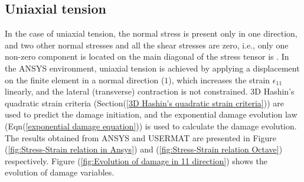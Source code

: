 \documentclass[12pt,twoside]{report}
\begin{document}
\subsection{Uniaxial tension}
\indent\indent\indent In the case of uniaxial tension, the normal stress is present only in one direction, and two other normal stresses and all the shear stresses are zero, i.e., only one non-zero component is located on the main diagonal of the stress tensor is .  In the ANSYS environment, uniaxial tension is achieved by applying a displacement on the finite element in a normal direction ($1$), which increases the strain $\epsilon_{11}$ linearly, and the lateral (transverse) contraction is not constrained. 3D Hashin's quadratic strain criteria (Section(\ref{3D Hashin's quadratic strain criteria})) are used to predict the damage initiation, and the exponential damage evolution law (Eqn(\ref{exponential damage equation})) is used to calculate the damage evolution. The results obtained from ANSYS and USERMAT are presented in Figure (\ref{fig:Stress-Strain relation in Ansys}) and (\ref{fig:Stress-Strain relation Octave}) respectively. Figure (\ref{fig:Evolution of damage in 11 direction}) shows the evolution of damage variables.\\ 
\end{document}
